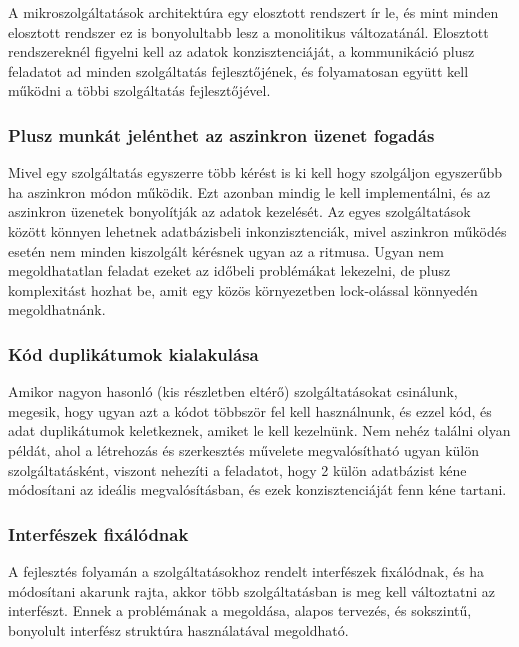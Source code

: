 \documentclass[11pt,magyar,a4paper,twoside,]{report}
\begin{document}
A mikroszolgáltatások architektúra egy elosztott rendszert ír le, és
mint minden elosztott rendszer ez is bonyolultabb lesz a monolitikus
változatánál. Elosztott rendszereknél figyelni kell az adatok
konzisztenciáját, a kommunikáció plusz feladatot ad minden szolgáltatás
fejlesztőjének, és folyamatosan együtt kell működni a többi szolgáltatás
fejlesztőjével.

\subsubsection{Plusz munkát jelénthet az aszinkron üzenet
fogadás}\label{plusz-munkuxe1t-jeluxe9nthet-az-aszinkron-uxfczenet-fogaduxe1s}

Mivel egy szolgáltatás egyszerre több kérést is ki kell hogy szolgáljon
egyszerűbb ha aszinkron módon működik. Ezt azonban mindig le kell
implementálni, és az aszinkron üzenetek bonyolítják az adatok kezelését.
Az egyes szolgáltatások között könnyen lehetnek adatbázisbeli
inkonzisztenciák, mivel aszinkron működés esetén nem minden kiszolgált
kérésnek ugyan az a ritmusa. Ugyan nem megoldhatatlan feladat ezeket az
időbeli problémákat lekezelni, de plusz komplexitást hozhat be, amit egy
közös környezetben lock-olással könnyedén megoldhatnánk.

\subsubsection{Kód duplikátumok
kialakulása}\label{kuxf3d-duplikuxe1tumok-kialakuluxe1sa}

Amikor nagyon hasonló (kis részletben eltérő) szolgáltatásokat
csinálunk, megesik, hogy ugyan azt a kódot többször fel kell
használnunk, és ezzel kód, és adat duplikátumok keletkeznek, amiket le
kell kezelnünk. Nem nehéz találni olyan példát, ahol a létrehozás és
szerkesztés művelete megvalósítható ugyan külön szolgáltatásként,
viszont nehezíti a feladatot, hogy 2 külön adatbázist kéne módosítani az
ideális megvalósításban, és ezek konzisztenciáját fenn kéne tartani.

\subsubsection{Interfészek
fixálódnak}\label{interfuxe9szek-fixuxe1luxf3dnak}

A fejlesztés folyamán a szolgáltatásokhoz rendelt interfészek
fixálódnak, és ha módosítani akarunk rajta, akkor több szolgáltatásban
is meg kell változtatni az interfészt. Ennek a problémának a megoldása,
alapos tervezés, és sokszintű, bonyolult interfész struktúra
használatával megoldható.
\end{document}
